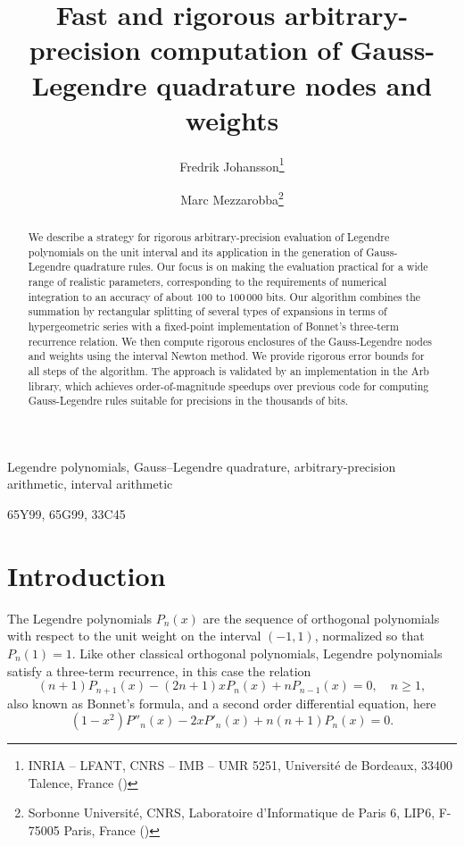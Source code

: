 \documentclass[nohypdvips,review]{siamart0216}
\begin{document}

\title{Fast and rigorous arbitrary-precision computation of Gauss-Legendre quadrature nodes and weights}
\author{Fredrik Johansson\thanks{INRIA -- LFANT, CNRS -- IMB -- UMR 5251, Université de Bordeaux, 33400 Talence, France ()}
 \and
Marc Mezzarobba\thanks{Sorbonne Université,  CNRS, Laboratoire d'Informatique
de Paris 6, LIP6, F-75005 Paris, France ()}}
\maketitle

\begin{abstract}
We describe a strategy for rigorous
arbitrary-precision evaluation of Legendre polynomials on the unit
interval and its application in the generation of Gauss-Legendre
quadrature rules.
Our focus is on making the evaluation practical for a wide range of
realistic parameters, corresponding to the requirements of numerical
integration to an accuracy of about $100$ to $100\,000$ bits.
Our algorithm combines the summation by rectangular
splitting of several types of expansions in terms of hypergeometric
series with a fixed-point implementation of Bonnet's three-term
recurrence relation.
We then compute rigorous enclosures of the Gauss-Legendre nodes and
weights using the interval Newton method.
We provide rigorous error bounds for all steps of the algorithm.
The approach is validated by an implementation in the Arb library,
which achieves order-of-magnitude speedups over
previous code for computing Gauss-Legendre rules suitable for precisions
in the thousands of bits.
\end{abstract}

\begin{keywords}
Legendre polynomials, Gauss--Legendre quadrature, arbitrary-precision arithmetic, interval arithmetic
\end{keywords}

\begin{AMS}
65Y99, 65G99, 33C45
\end{AMS}

\section{Introduction}

The Legendre polynomials $P_n(x)$ are the sequence
of orthogonal polynomials with respect to the unit weight
on the interval $(-1,1)$, normalized so that $P_n(1) = 1$.
Like other classical orthogonal polynomials, Legendre polynomials
satisfy a three-term recurrence, in this case the relation
\begin{equation} \label{eq:recurrence}
  (n + 1) P_{n+1}(x) - (2n + 1) x P_n(x) + n P_{n-1}(x) = 0,
  \quad n \geq 1,
\end{equation}
also known as Bonnet's formula, and a second order differential equation, here
\begin{equation} \label{eq:diffeq}
  (1 - x^2) P''_n(x) - 2 x P'_n(x) + n (n+1) P_n(x) = 0.
\end{equation}
\end{document}
